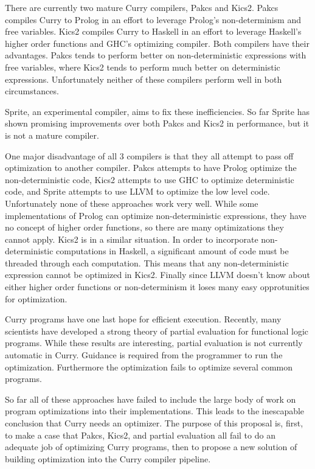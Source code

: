 There are currently two mature Curry compilers, Pakcs and Kics2.
Pakcs compiles Curry to Prolog in an effort to leverage Prolog's non-determinism and free variables.
Kics2 compiles Curry to Haskell in an effort to leverage Haskell's higher order functions and GHC's optimizing compiler.
Both compilers have their advantages.  Pakcs tends to perform better on non-deterministic expressions with free variables,
where Kics2 tends to perform much better on deterministic expressions.
Unfortunately neither of these compilers perform well in both circumstances.

Sprite, an experimental compiler, aims to fix these inefficiencies.
So far Sprite has shown promising improvements over both Pakcs and Kics2 in performance,
but it is not a mature compiler.

One major disadvantage of all 3 compilers is that they all attempt to pass off optimization to another compiler.
Pakcs attempts to have Prolog optimize the non-deterministic code, Kics2 attempts to use GHC to optimize
deterministic code, and Sprite attempts to use LLVM to optimize the low level code.
Unfortunately none of these approaches work very well.
While some implementations of Prolog can optimize non-deterministic expressions, they have no concept of higher order functions,
so there are many optimizations they cannot apply.
Kics2 is in a similar situation.  
In order to incorporate non-deterministic computations in Haskell, 
a significant amount of code must be threaded through each computation.
This means that any non-deterministic expression cannot be optimized in Kics2.
Finally since LLVM doesn't know about either higher order functions or non-determinism it loses many easy opprotunities for optimization.

Curry programs have one last hope for efficient execution.
Recently, many scientists \cite{peval_bjorn, offline_peval_Ramos} 
have developed a strong theory of partial evaluation for functional logic programs.
While these results are interesting, partial evaluation is not currently automatic in Curry.
Guidance is required from the programmer to run the optimization.
Furthermore the optimization fails to optimize several common programs.

So far all of these approaches have failed to include the large body of work on program optimizations into their implementations.
This leads to the inescapable conclusion that Curry needs an optimizer.
The purpose of this proposal is, first, to make a case that Pakcs, Kics2, and partial evaluation all fail to do an adequate job
of optimizing Curry programs, then to propose a new solution of building optimization into the Curry compiler pipeline.

